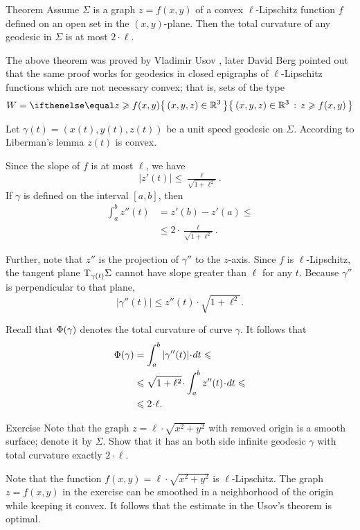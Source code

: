 \begin{thm}{Theorem}\label{thm:usov}
Assume $\Sigma$ is a graph $z=f(x,y)$ of a convex $\ell$-Lipschitz function $f$ defined on an open set in the $(x,y)$-plane.
Then the total curvature of any geodesic in $\Sigma$ is at most $2\cdot \ell$.
\end{thm}

The above theorem was proved by Vladimir Usov \cite{usov},
later David Berg \cite{berg} pointed out that the same proof works for geodesics in closed epigraphs of $\ell$-Lipschitz functions which are not necessary convex; that is, sets of the type 
\[W=\set{(x,y,z)\in\RR^3}{z\ge f(x,y)}\]

Let $\gamma(t)=(x(t),y(t),z(t))$ be a unit speed geodesic on $\Sigma$.
According to Liberman's lemma 
$z(t)$ is convex.

Since the slope of $f$ is at most $\ell$, we have
\[|z'(t)|\le \tfrac{\ell}{\sqrt{1+\ell^2}}.\]
If $\gamma$ is defined on the interval $[a,b]$, then
\begin{align*}
\int_a^b z''(t)&=z'(b)-z'(a)\le 
\\
&\le 2\cdot \tfrac{\ell}{\sqrt{1+\ell^2}}.
\end{align*}

Further, note that $z''$ is the projection of $\gamma''$ to the $z$-axis.
Since $f$ is $\ell$-Lipschitz, the tangent plane $\mathrm{T}_{\gamma (t)} \Sigma$ cannot have slope greater than $\ell$ for any $t$.
Because $\gamma ''$ is perpendicular to that plane, 
\[|\gamma'' (t)|  \le  z''(t)\cdot\sqrt{1+ \ell ^2}.\]

Recall that $\Phi({\gamma})$ denotes the total curvature of curve $\gamma$.
It follows that 
\begin{align*}
\tc\gamma&=\int_a^b|\gamma'' (t)|\cdot dt\le 
\\
&\le \sqrt{1+ \ell ^2}\cdot  \int_a^b z''(t)\cdot dt\le 
\\
&\le 2\cdot \ell.
\end{align*}
\qedsf

\begin{thm}{Exercise}
Note that the graph $z=\ell\cdot\sqrt{x^2+y^2}$ with removed origin is a smooth surface; denote it by $\Sigma$.
Show that it has an both side infinite geodesic $\gamma$ with total curvature exactly $2\cdot \ell$.
\end{thm}

Note that the function $f(x,y)=\ell\cdot\sqrt{x^2+y^2}$ is $\ell$-Lipschitz.
The graph $z=f(x,y)$ in the exercise can be smoothed in a neighborhood of the origin while keeping it convex.
It follows that the estimate in the Usov's theorem is optimal.


